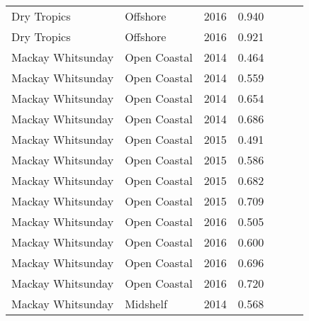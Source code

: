 {\begin{longtable}{llccccc}
  Dry Tropics & Offshore & 2016 & 0.940 & \cellcolor[HTML]{00734D}{A} & \cellcolor[HTML]{00734D}{A} & \cellcolor[HTML]{00734D}{A} \\ 
  Dry Tropics & Offshore & 2016 & 0.921 & \cellcolor[HTML]{00734D}{A} & \cellcolor[HTML]{00734D}{A} & \cellcolor[HTML]{00734D}{A} \\ 
  Mackay Whitsunday & Open Coastal & 2014 & 0.464 & \cellcolor[HTML]{F47721}{D} & \cellcolor[HTML]{F0C918}{C} & \cellcolor[HTML]{F47721}{D} \\ 
  Mackay Whitsunday & Open Coastal & 2014 & 0.559 & \cellcolor[HTML]{F0C918}{C} & \cellcolor[HTML]{F0C918}{C} & \cellcolor[HTML]{F0C918}{C} \\ 
  Mackay Whitsunday & Open Coastal & 2014 & 0.654 & \cellcolor[HTML]{F0C918}{C} & \cellcolor[HTML]{B0D235}{B} & \cellcolor[HTML]{B0D235}{B} \\ 
  Mackay Whitsunday & Open Coastal & 2014 & 0.686 & \cellcolor[HTML]{B0D235}{B} & \cellcolor[HTML]{B0D235}{B} & \cellcolor[HTML]{B0D235}{B} \\ 
  Mackay Whitsunday & Open Coastal & 2015 & 0.491 & \cellcolor[HTML]{F47721}{D} & \cellcolor[HTML]{F0C918}{C} & \cellcolor[HTML]{F47721}{D} \\ 
  Mackay Whitsunday & Open Coastal & 2015 & 0.586 & \cellcolor[HTML]{F0C918}{C} & \cellcolor[HTML]{F0C918}{C} & \cellcolor[HTML]{F0C918}{C} \\ 
  Mackay Whitsunday & Open Coastal & 2015 & 0.682 & \cellcolor[HTML]{B0D235}{B} & \cellcolor[HTML]{B0D235}{B} & \cellcolor[HTML]{B0D235}{B} \\ 
  Mackay Whitsunday & Open Coastal & 2015 & 0.709 & \cellcolor[HTML]{B0D235}{B} & \cellcolor[HTML]{B0D235}{B} & \cellcolor[HTML]{B0D235}{B} \\ 
  Mackay Whitsunday & Open Coastal & 2016 & 0.505 & \cellcolor[HTML]{F0C918}{C} & \cellcolor[HTML]{F0C918}{C} & \cellcolor[HTML]{F0C918}{C} \\ 
  Mackay Whitsunday & Open Coastal & 2016 & 0.600 & \cellcolor[HTML]{F0C918}{C} & \cellcolor[HTML]{B0D235}{B} & \cellcolor[HTML]{F0C918}{C} \\ 
  Mackay Whitsunday & Open Coastal & 2016 & 0.696 & \cellcolor[HTML]{B0D235}{B} & \cellcolor[HTML]{B0D235}{B} & \cellcolor[HTML]{B0D235}{B} \\ 
  Mackay Whitsunday & Open Coastal & 2016 & 0.720 & \cellcolor[HTML]{B0D235}{B} & \cellcolor[HTML]{B0D235}{B} & \cellcolor[HTML]{B0D235}{B} \\ 
  Mackay Whitsunday & Midshelf & 2014 & 0.568 & \cellcolor[HTML]{F0C918}{C} & \cellcolor[HTML]{F0C918}{C} & \cellcolor[HTML]{F0C918}{C} \\ 

\end{longtable}}
